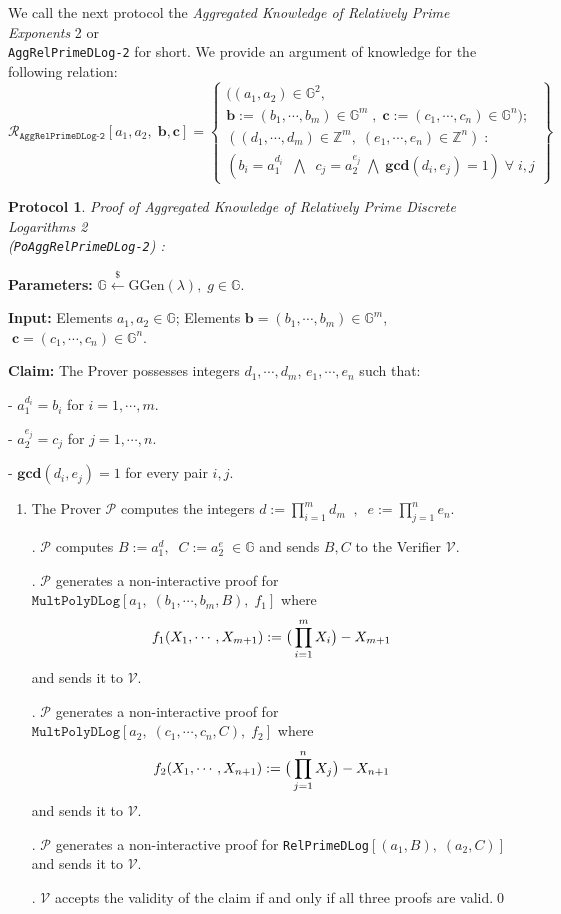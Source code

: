 \documentclass[11pt, lettersize, notitlepage, leqno, footskip=0.6cm]{article}
\newcommand{\bz}{\mathbb Z}
\newcommand{\pl}{\prod\limits}
\newcommand{\ttt}{\texttt}
\newcommand{\mc}{\mathcal}
\newcommand{\mb}{\mathbb}
\newcommand{\mbf}{\mathbf}
\newcommand{\mr}{\mathrm}
\newcommand{\lamb}{\lambda}
\newcommand{\vs}{\vspace{-0.15cm}}
\newcommand{\noin}{\noindent}
\newcommand{\GCD}{\mbf{gcd}}
\newtheorem{Prot}[Thm]{Protocol}
\numberwithin{equation}{section}
\begin{document}
We call the next protocol the \textit{Aggregated Knowledge of Relatively Prime Exponents} 2 or\\ \verb|AggRelPrimeDLog-2| for short. We provide an argument of knowledge for the following relation: \[
  \mc{R}_{\ttt{AggRelPrimeDLog-2}}[a_1, a_2,\; \mbf{b}, \mbf{c}] = \left\{\begin{array}{l}
    ((a_1,a_2)\in\mb{G}^2,\;\\
     \mbf{b}:=(b_1,\cdots, b_m)\in\mb{G}^m\;,\;\mbf{c}:= (c_1,\cdots, c_n)\in\mb{G}^n);\\
    ((d_1,\cdots,d_m)\in\bz^m,\; (e_1,\cdots,e_n)\in\bz^n)\;: \\
    (b_i = a_1^{d_i}\;\;\bigwedge\;\; c_j = a_2^{e_j}\;\bigwedge\; \GCD(d_i, e_j) = 1)\;\forall \;i,j   	
  \end{array}\right\}
\]  \vspace{0.1cm}


\begin{Prot} \normalfont \hypertarget{RP2}{\textit{Proof of Aggregated Knowledge of Relatively Prime Discrete Logarithms} 2}\\ (\verb|PoAggRelPrimeDLog-2|) :\end{Prot}\vspace{-0.3cm}

\noin \textbf{Parameters:} $\mb{G}\xleftarrow{\$} \mr{GGen}(\lamb), \; g\in \mb{G}$.

\noin \textbf{Input:} Elements $a_1, a_2\in \mb{G}$; Elements $\mbf{b} = (b_1,\cdots, b_m)\in\mb{G}^m$, $\;\mbf{c} = (c_1,\cdots, c_n)\in\mb{G}^n$.

\noin \textbf{Claim:} The Prover possesses integers $d_1,\cdots, d_m$,\; $e_1,\cdots,e_n$ such that:

\noin - $a_1^{d_i} = b_i$ for $i = 1,\cdots, m$.

\noin - $a_2^{e_j} = c_j$ for $j = 1,\cdots, n$.

\noin - $\GCD(d_i, e_j) = 1$ for every pair $i, j$.


\begin{enumerate}[wide, labelwidth=!, labelindent=0pt]\vs \item The Prover $\mc{P}$ computes the integers ${d}:= \prod_{i=1}^m d_m\;\;,\;\; {e}:= \prod_{j=1}^n e_n.$ 

\noin 2. $\mc{P}$ computes $B:= a_1^{d},\;\;C:= a_2^{e}\;\in\mb{G}$ and sends $B, C$ to the Verifier $\mc{V}$.

\noin 3. $\mc{P}$ generates a non-interactive proof for $\ttt{MultPolyDLog}[a_1,\;(b_1,\cdots,b_m, B),\; f_1]$ where \vs $$f_1(X_1,\cdots, X_{m+1}):= \big(\pl_{i=1}^m X_i\big) -X_{m+1}\vs $$ and sends it to $\mc{V}$.

\noin 4. $\mc{P}$ generates a non-interactive proof for $ \ttt{MultPolyDLog}[a_2,\;(c_1,\cdots,c_n, C),\; f_2]$ where \vs $$f_2(X_1,\cdots, X_{n+1}):= \big(\pl_{j=1}^n X_j\big) -X_{n+1}\vs $$ and sends it to $\mc{V}$.

\noin 5. $\mc{P}$ generates a non-interactive proof for \verb|RelPrimeDLog|$[(a_1, B),\;(a_2, C)]$ and sends it to $\mc{V}$. 

\noin 6. $\mc{V}$ accepts the validity of the claim if and only if all three proofs are valid.\qed \end{enumerate}
\end{document}
